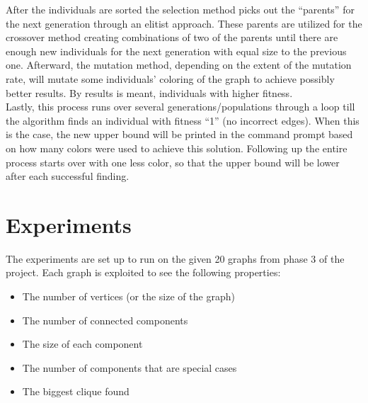 \documentclass[a4paper]{report}
\begin{document}
		After the individuals are sorted the selection method picks out the “parents” for the next generation through an elitist approach. These parents are utilized for the crossover method creating combinations of two of the parents until there are enough new individuals for the next generation with equal size to the previous one. Afterward, the mutation method, depending on the extent of the mutation rate, will mutate some individuals’ coloring of the graph to achieve possibly better results. By results is meant, individuals with higher fitness.
\\
		
		Lastly, this process runs over several generations/populations through a loop till the algorithm finds an individual with fitness “1” (no incorrect edges). When this is the case, the new upper bound will be printed in the command prompt based on how many colors were used to achieve this solution. Following up the entire process starts over with one less color, so that the upper bound will be lower after each successful finding.
		
		
		
	\chapter{Experiments}
	The experiments are set up to run on the given 20 graphs from phase 3 of the project. Each graph is exploited to see the following properties:
	\begin{itemize}
		\item The number of vertices (or the size of the graph)
		\item The number of connected components
		\item The size of each component
		\item The number of components that are special cases
		\item The biggest clique found
	\end{itemize}
\end{document}
